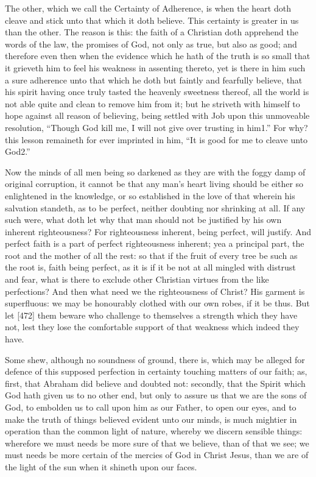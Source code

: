 The other, which we call the Certainty of Adherence, is when the heart doth cleave and stick unto that which it doth believe. This certainty is greater in us than the other. The reason is this: the faith of a Christian doth apprehend the words of the law, the promises of God, not only as true, but also as good; and therefore even then when the evidence which he hath of the truth is so small that it grieveth him to feel his weakness in assenting thereto, yet is there in him such a sure adherence unto that which he doth but faintly and fearfully believe, that his spirit having once truly tasted the heavenly sweetness thereof, all the world is not able quite and clean to remove him from it; but he striveth with himself to hope against all reason of believing, being settled with Job upon this unmoveable resolution, “Though God kill me, I will not give over trusting in him1.” For why? this lesson remaineth for ever imprinted in him, “It is good for me to cleave unto God2.”

Now the minds of all men being so darkened as they are with the foggy damp of original corruption, it cannot be that any man’s heart living should be either so enlightened in the knowledge, or so established in the love of that wherein his salvation standeth, as to be perfect, neither doubting nor shrinking at all. If any such were, what doth let why that man should not be justified by his own inherent righteousness? For righteousness inherent, being perfect, will justify. And perfect faith is a part of perfect righteousness inherent; yea a principal part, the root and the mother of all the rest: so that if the fruit of every tree be such as the root is, faith being perfect, as it is if it be not at all mingled with distrust and fear, what is there to exclude other Christian virtues from the like perfections? And then what need we the righteousness of Christ? His garment is superfluous: we may be honourably clothed with our own robes, if it be thus. But let [472] them beware who challenge to themselves a strength which they have not, lest they lose the comfortable support of that weakness which indeed they have.

Some shew, although no soundness of ground, there is, which may be alleged for defence of this supposed perfection in certainty touching matters of our faith; as, first, that Abraham did believe and doubted not: secondly, that the Spirit which God hath given us to no other end, but only to assure us that we are the sons of God, to embolden us to call upon him as our Father, to open our eyes, and to make the truth of things believed evident unto our minds, is much mightier in operation than the common light of nature, whereby we discern sensible things: wherefore we must needs be more sure of that we believe, than of that we see; we must needs be more certain of the mercies of God in Christ Jesus, than we are of the light of the sun when it shineth upon our faces.

